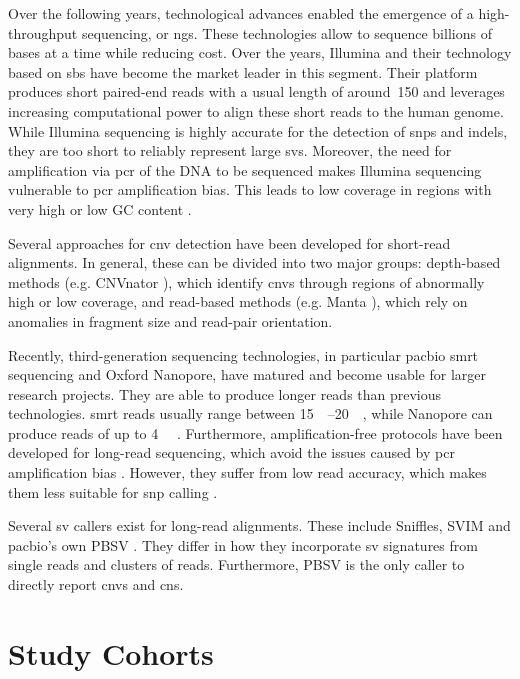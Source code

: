 \documentclass[draft, twoside=false]{scrbook}
\begin{document}
Over the following years, technological advances enabled the emergence of a high-throughput sequencing, or \gls{ngs}.
These technologies allow to sequence billions of bases at a time while reducing cost.
Over the years, Illumina and their technology based on \gls{sbs} have become the market leader in this segment.
Their platform produces short paired-end reads with a usual length of around \qty{150}{\base} and leverages increasing computational power to align these short reads to the human genome.
While Illumina sequencing is highly accurate for the detection of \glspl{snp} and \glspl{indel}, they are too short to reliably represent large \glspl{sv}.
Moreover, the need for amplification via \gls{pcr} of the DNA to be sequenced makes Illumina sequencing vulnerable to \gls{pcr} amplification bias.
This leads to low coverage in regions with very high or low GC content \cite{Aird2011}.

Several approaches for \gls{cnv} detection have been developed for short-read alignments.
In general, these can be divided into two major groups: depth-based methods (e.g. \textsf{CNVnator} \cite{Abyzov2011b}), which identify \glspl{cnv} through regions of abnormally high or low coverage, and read-based methods (e.g. \textsf{Manta} \cite{Chen2016a}), which rely on anomalies in fragment size and read-pair orientation.

Recently, third-generation sequencing technologies, in particular \gls{pacbio} \gls{smrt} sequencing and Oxford Nanopore, have matured and become usable for larger research projects.
They are able to produce longer reads than previous technologies.
\Gls{smrt} reads usually range between \qtyrange{15}{20}{\kilo\base}, while Nanopore can produce reads of up to \qty{4}{\mega\base} \cite{Wenger2019,Payne2019}.
Furthermore, amplification-free protocols have been developed for long-read sequencing, which avoid the issues caused by \gls{pcr} amplification bias \cite{Hoijer2018}.
However, they suffer from low read accuracy, which makes them less suitable for \gls{snp} calling \cite{Rang2018}.

Several \gls{sv} callers exist for long-read alignments.
These include \textsf{Sniffles}, \textsf{SVIM} and \gls{pacbio}'s own \textsf{PBSV} \cite{Heller2019a,Sedlazeck2018a}.
They differ in how they incorporate \gls{sv} signatures from single reads and clusters of reads.
Furthermore, \textsf{PBSV} is the only caller to directly report \glspl{cnv} and \glspl{cn}.

\section{Study Cohorts}
\end{document}
